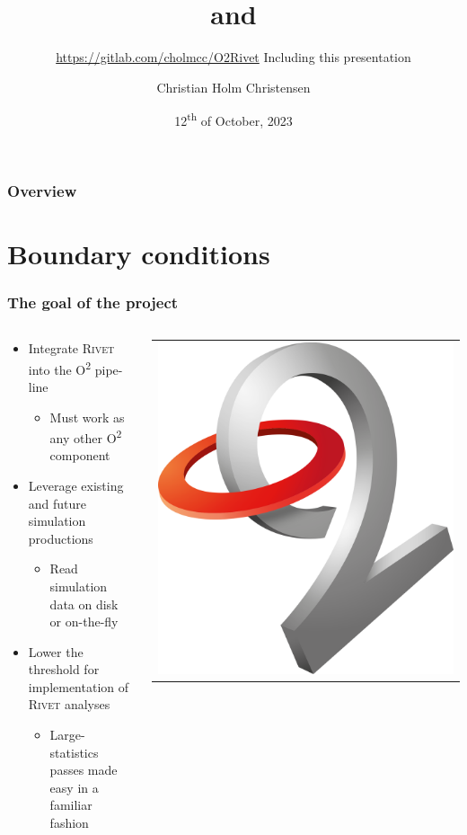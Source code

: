 \documentclass[compress,table,8pt]{beamer}
\title{\ALICE{} \Otwo{} and \Rivet}%
\subtitle{\url{https://gitlab.com/cholmcc/O2Rivet}\newline%
  {\footnotesize Including this presentation}}
\author[C.H.Christensen]{Christian Holm Christensen}
\institute{\inst{1}Niels Bohr Institute}
\date[12.~Oct, 2023]{12\textsuperscript{th} of October, 2023}
\newcommand\Rivet{{\scshape Rivet}}
\newcommand\Otwo{O\textsuperscript{2}}
\begin{document}
\aliceTitlePage{}
\begin{frame}
  \frametitle{Overview}
  \Overview{}
\end{frame}
\section{Boundary conditions}
\begin{frame}
  \frametitle{The goal of the project}
  \begin{columns}
    \begin{column}{.7\linewidth}
      \begin{itemize}
      \item<+-> Integrate \Rivet{} into the \ALICE{} \Otwo{} pipe-line
        \begin{itemize}
        \item Must work as any other \Otwo{} component
        \end{itemize}
      \item<+-> Leverage existing and future simulation productions
        \begin{itemize}
        \item Read simulation data on disk or on-the-fly
        \end{itemize}
      \item<+-> Lower the threshold for implementation of \ALICE{}
        \Rivet{} analyses
        \begin{itemize}
        \item Large-statistics passes made easy in a familiar fashion
        \end{itemize}
      \end{itemize}
    \end{column}
    \begin{column}{.25\linewidth}
      \begin{tabular}{c}
        \includegraphics[width=.8\linewidth]{o2}\\

\end{tabular}
\end{column}
\end{columns}
\end{frame}
\end{document}
